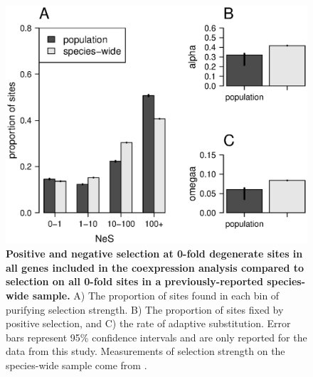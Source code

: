 \begin{figure}[ht!]
      \centering
       \includegraphics[width=\linewidth]{Ch4FigAll}
    \caption{\textbf{Positive and negative selection at 0-fold degenerate sites in all genes included in the coexpression analysis compared to selection on all 0-fold sites in a previously-reported species-wide sample.} A) The proportion of sites found in each bin of purifying selection strength. B) The proportion of sites fixed by positive selection, and C) the rate of adaptive substitution. Error bars represent 95\% confidence intervals and are only reported for the data from this study. Measurements of selection strength on the species-wide sample come from \citep{Williamson2014-tf}.}
    \label{fig:fsAll}
\end{figure}
